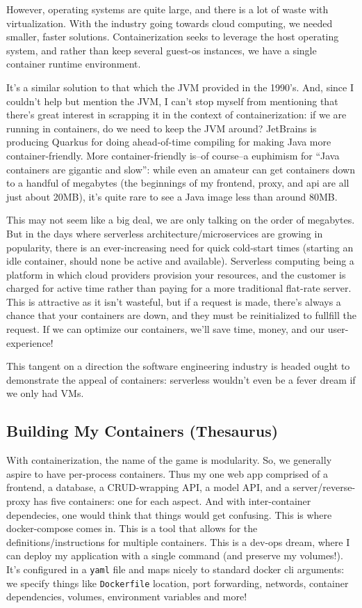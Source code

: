 \documentclass[11pt, twoside, reqno]{book}
\begin{document}
However, operating systems are quite large, and there is a lot of waste with virtualization. With the industry going towards cloud computing, we needed smaller, faster solutions. Containerization seeks to leverage the host operating system, and rather than keep several guest-os instances, we have a single container runtime environment.


It's a similar solution to that which the JVM provided in the 1990's. And, since I couldn't help but mention the JVM, I can't stop myself from mentioning that there's great interest in scrapping it in the context of containerization: if we are running in containers, do we need to keep the JVM around? JetBrains is producing Quarkus for doing ahead-of-time compiling for making Java more container-friendly. More container-friendly is--of course--a euphimism for ``Java containers are gigantic and slow'': while even an amateur can get containers down to a handful of megabytes (the beginnings of my frontend, proxy, and api are all just about 20MB), it's quite rare to see a Java image less than around 80MB.

This may not seem like a big deal, we are only talking on the order of megabytes. But in the days where serverless architecture/microservices are growing in popularity, there is an ever-increasing need for quick cold-start times (starting an idle container, should none be active and available). Serverless computing being a platform in which cloud providers provision your resources, and the customer is charged for active time rather than paying for a more traditional flat-rate server. This is attractive as it isn't wasteful, but if a request is made, there's always a chance that your containers are down, and they must be reinitialized to fullfill the request. If we can optimize our containers, we'll save time, money, and our user-experience!

This tangent on a direction the software engineering industry is headed ought to demonstrate the appeal of containers: serverless wouldn't even be a fever dream if we only had VMs.

\subsection{Building My Containers (Thesaurus)}

With containerization, the name of the game is modularity. So, we generally aspire to have per-process containers. Thus my one web app comprised of a frontend, a database, a CRUD-wrapping API, a model API, and a server/reverse-proxy has five containers: one for each aspect. And with inter-container dependecies, one would think that things would get confusing. This is where docker-compose comes in. This is a tool that allows for the definitions/instructions for multiple containers. This is a dev-ops dream, where I can deploy my application with a single command (and preserve my volumes!). It's configured in a \texttt{yaml} file and maps nicely to standard docker cli arguments: we specify things like \texttt{Dockerfile} location, port forwarding, networds, container dependencies, volumes, environment variables and more!
\end{document}
